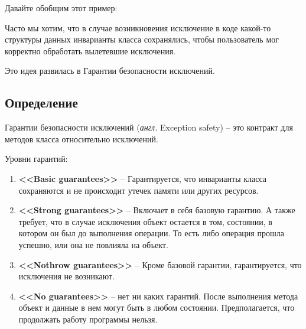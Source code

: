 Давайте обобщим этот пример:

Часто мы хотим, что в случае возникновения исключение в коде какой-то структуры данных инварианты класса сохранялись, чтобы пользователь мог корректно обработать вылетевшие исключения.

Это идея развилась в Гарантии безопасности исключений.

\subsection{Определение}

Гарантии безопасности исключений (\textit{англ.} Exception safety) -- это контракт для методов класса относительно исключений.

Уровни гарантий:
\begin{enumerate}
\item \textbf{<<Basic guarantees>>} -- Гарантируется, что инварианты класса сохраняются и не происходит утечек памяти или других ресурсов.
\item \textbf{<<Strong guarantees>>} -- Включает в себя базовую гарантию. А также требует, что в случае исключения объект остается в том, состоянии, в котором он был до выполнения операции. То есть либо операция прошла успешно, или она не повлияла на объект.
\item \textbf{<<Nothrow guarantees>>} -- Кроме базовой гарантии, гарантируется, что исключения не возникают.
\item \textbf{<<No guarantees>>} -- нет ни каких гарантий. После выполнения метода объект и данные в нем могут быть в любом состоянии. Предполагается, что продолжать работу программы нельзя.
\end{enumerate}

